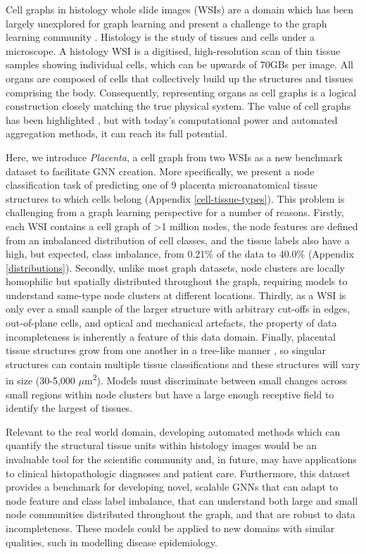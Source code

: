 \documentclass{article}
\begin{document}
Cell graphs in histology whole slide images (WSIs) are a domain which has been largely unexplored for graph learning and present a challenge to the graph learning community \cite{lu_capturing_2020,zhou_cgc-net_2019,gadiya_histographs_2019,chen_pathomic_2020,lu_slidegraph_2022}. Histology is the study of tissues and cells under a microscope. A histology WSI is a digitised, high-resolution scan of thin tissue samples showing individual cells, which can be upwards of 70GBs per image. All organs are composed of cells that collectively build up the structures and tissues comprising the body. Consequently, representing organs as cell graphs is a logical construction closely matching the true physical system. The value of cell graphs has been highlighted \cite{yener_cell-graphs_2017,javed_cellular_2020,sirinukunwattana_novel_2018}, but with today's computational power and automated aggregation methods, it can reach its full potential.

Here, we introduce \emph{Placenta}, a cell graph from two WSIs as a new benchmark dataset to facilitate GNN creation. More specifically, we present a node classification task of predicting one of 9 placenta microanatomical tissue structures to which cells belong (Appendix \ref{cell-tissue-types}). This problem is challenging from a graph learning perspective for a number of reasons. Firstly, each WSI contains a cell graph of >1 million nodes, the node features are defined from an imbalanced distribution of cell classes, and the tissue labels also have a high, but expected, class imbalance, from 0.21\% of the data to 40.0\% (Appendix \ref{distributions}). Secondly, unlike most graph datasets, node clusters are locally homophilic but spatially distributed throughout the graph, requiring models to understand same-type node clusters at different locations. Thirdly, as a WSI is only ever a small sample of the larger structure with arbitrary cut-offs in edges, out-of-plane cells, and optical and mechanical artefacts, the property of data incompleteness is inherently a feature of this data domain. Finally, placental tissue structures grow from one another in a tree-like manner \cite{benirschke_architecture_2012,ernst_placenta_2019}, so singular structures can contain multiple tissue classifications and these structures will vary in size (30-5,000 $\mu$m\textsuperscript{2}). Models must discriminate between small changes across small regions within node clusters but have a large enough receptive field to identify the largest of tissues. 

Relevant to the real world domain, developing automated methods which can quantify the structural tissue units within histology images would be an invaluable tool for the scientific community and, in future, may have applications to clinical histopathologic diagnoses and patient care. Furthermore, this dataset provides a benchmark for developing novel, scalable GNNs that can adapt to node feature and class label imbalance, that can understand both large and small node communities distributed throughout the graph, and that are robust to data incompleteness. These models could be applied to new domains with similar qualities, such in modelling disease epidemiology. 
\end{document}

